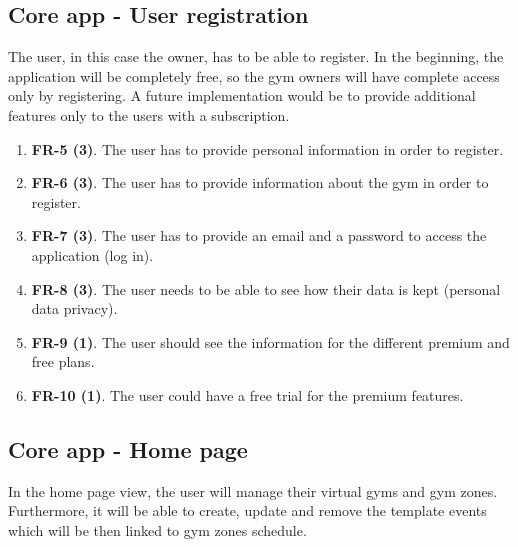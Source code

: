 \documentclass[a4paper, 12pt, oneside]{book}
\begin{document}
\subsection{Core app - User registration}
The user, in this case the owner, has to be able to register. In the beginning, the application will be completely free, so the gym owners will have complete access only by registering. A future implementation would be to provide additional features only to the users with a subscription.
\begin{enumerate}[label = -]
	\item \textbf{FR-5 (3)}. The user has to provide personal information in order to register.
	\item \textbf{FR-6 (3)}. The user has to provide information about the gym in order to register.
	\item \textbf{FR-7 (3)}. The user has to provide an email and a password to access the application (log in).
	\item \textbf{FR-8 (3)}. The user needs to be able to see how their data is kept (personal data privacy).
	\item \textbf{FR-9 (1)}. The user should see the information for the different premium and free plans.
	\item \textbf{FR-10 (1)}. The user could have a free trial for the premium features.
\end{enumerate}
\subsection{Core app - Home page}
In the home page view, the user will manage their virtual gyms and gym zones. Furthermore, it will be able to create, update and remove the template events which will be then linked to gym zones schedule.
\end{document}
